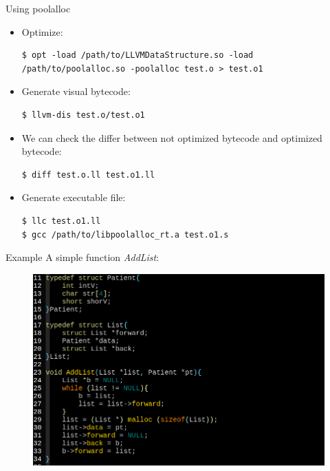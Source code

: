 \documentclass{beamer}
\begin{document}
\begin{frame}[fragile]{Using poolalloc}
  \begin{itemize}
	\item Optimize: 
	  \begin{lstlisting}
$ opt -load /path/to/LLVMDataStructure.so -load 
/path/to/poolalloc.so -poolalloc test.o > test.o1
\end{lstlisting}
	\item Generate visual bytecode: 
	  \begin{lstlisting}
$ llvm-dis test.o/test.o1
\end{lstlisting}
	\item We can check the differ between not optimized bytecode and optimized bytecode: 
	  \begin{lstlisting}
$ diff test.o.ll test.o1.ll
\end{lstlisting}
	\item Generate executable file: 
	\begin{lstlisting}
$ llc test.o1.ll
$ gcc /path/to/libpoolalloc_rt.a test.o1.s
\end{lstlisting}
  \end{itemize}
\end{frame}

\begin{frame}{Example}
  A simple function \emph{AddList}:
  \begin{figure}[H]
	\centering
	\includegraphics[scale = 0.3]{./fig/src.png}
  \end{figure}
\end{frame}
\end{document}
